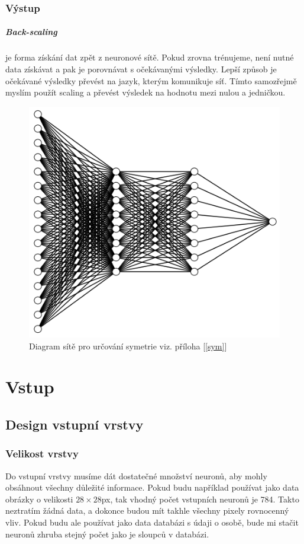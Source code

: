 \documentclass[12pt,a4paper]{report}
\begin{document}
	\subsection{Výstup}
		\paragraph{Back-scaling}
		je forma získání dat zpět z neuronové sítě. Pokud zrovna trénujeme, není nutné data získávat a pak je porovnávat s očekávanými výsledky. Lepší způsob je očekávané výsledky převést na jazyk, kterým komunikuje síť. Tímto samozřejmě myslím použít scaling a převést výsledek na hodnotu mezi nulou a jedničkou.
	\begin{figure}[h]
		\centering
		\includegraphics[width=15cm]{images/nn16-8-8-1}
		\caption{Diagram sítě pro určování symetrie viz. příloha [\ref{sym}]}
	\end{figure}
\chapter{Vstup}
	\section{Design vstupní vrstvy}
		\subsection{Velikost vrstvy}
		Do vstupní vrstvy musíme dát dostatečné množství neuronů, aby mohly obsáhnout všechny důležité informace. Pokud budu například používat jako data obrázky o velikosti $28\times 28$px, tak vhodný počet vstupních neuronů je 784. Takto neztratím žádná data, a dokonce budou mít takhle všechny pixely rovnocenný vliv. Pokud budu ale používat jako data databázi s údaji o osobě, bude mi stačit neuronů zhruba stejný počet jako je sloupců v databázi.
\end{document}
